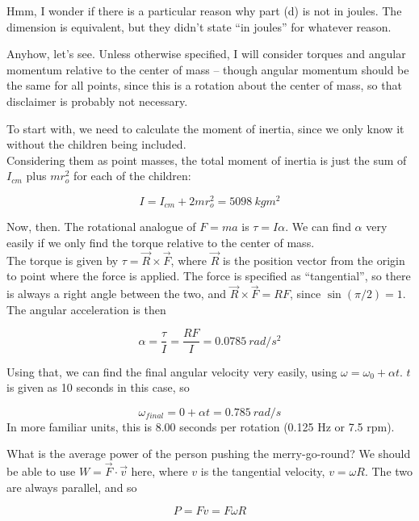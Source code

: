 \documentclass[8.01x]{subfiles}
\begin{document}
Hmm, I wonder if there is a particular reason why part (d) is not in joules. The dimension is equivalent, but they didn't state ``in joules'' for whatever reason.

Anyhow, let's see. Unless otherwise specified, I will consider torques and angular momentum relative to the center of mass -- though angular momentum should be the same for all points, since this is a rotation about the center of mass, so that disclaimer is probably not necessary.

To start with, we need to calculate the moment of inertia, since we only know it without the children being included.\\
Considering them as point masses, the total moment of inertia is just the sum of $I_{cm}$ plus $m r_o^2$ for each of the children:

\begin{equation}
I = I_{cm} + 2 m r_o^2 = \SI{5098}{kg m^2}
\end{equation}

Now, then. The rotational analogue of $F = m a$ is $\tau = I \alpha$. We can find $\alpha$ very easily if we only find the torque relative to the center of mass.\\
The torque is given by $\tau = \vec{R} \times \vec{F}$, where $\vec{R}$ is the position vector from the origin to point where the force is applied. The force is specified as ``tangential'', so there is always a right angle between the two, and $\vec{R} \times \vec{F} = R F$, since $\sin(\pi/2) = 1$. The angular acceleration is then

\begin{equation}
\alpha = \frac{\tau}{I} = \frac{R F}{I} = \SI{0.0785}{rad/s^2}
\end{equation}

Using that, we can find the final angular velocity very easily, using $\omega = \omega_0 + \alpha t$. $t$ is given as 10 seconds in this case, so

\begin{equation}
\omega_{final} = 0 + \alpha t = \SI{0.785}{rad/s}
\end{equation}
In more familiar units, this is 8.00 seconds per rotation (0.125 Hz or 7.5 rpm).

What is the average power of the person pushing the merry-go-round? We should be able to use $W = \vec{F} \cdot \vec{v}$ here, where $v$ is the tangential velocity, $v = \omega R$. The two are always parallel, and so

\begin{equation}
P = F v = F \omega R
\end{equation}
\end{document}
